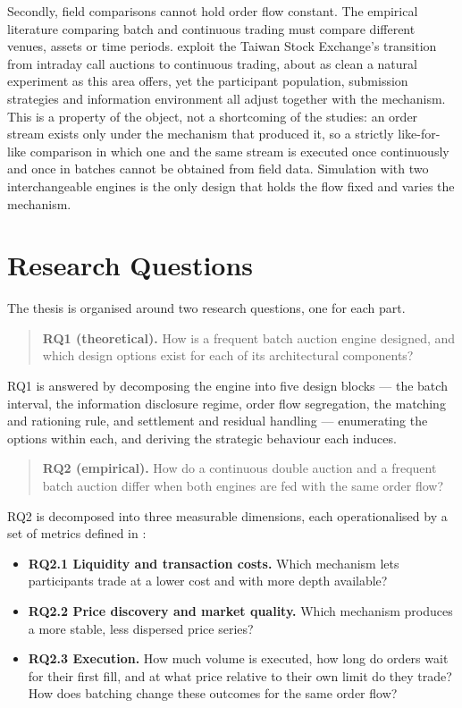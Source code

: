 Secondly, field comparisons cannot hold order flow constant. The
empirical literature comparing batch and continuous trading must compare different venues, assets or time periods. \citet{lee2026taiwan}
exploit the Taiwan Stock Exchange's transition from intraday call auctions
to continuous trading, about as clean a natural experiment as this area
offers, yet the participant population, submission strategies and
information environment all adjust together with the mechanism. This is a
property of the object, not a shortcoming of the studies: an order stream
exists only under the mechanism that produced it, so a strictly
like-for-like comparison in which one and the same stream is executed once
continuously and once in batches cannot be obtained from field data.
Simulation with two interchangeable engines is the only design that holds
the flow fixed and varies the mechanism.

\section{Research Questions}
\label{sec:rqs}

The thesis is organised around two research questions, one for each part.

\begin{quote}
\textbf{RQ1 (theoretical).} How is a frequent batch auction engine
designed, and which design options exist for each of its architectural
components?
\end{quote}

RQ1 is answered by decomposing the engine into five design blocks --- the
batch interval, the information disclosure regime, order flow segregation,
the matching and rationing rule, and settlement and residual handling ---
enumerating the options within each, and deriving the strategic behaviour
each induces.

\begin{quote}
\textbf{RQ2 (empirical).} How do a continuous double auction and a
frequent batch auction differ when both engines are fed with the same
order flow?
\end{quote}

RQ2 is decomposed into three measurable dimensions, each operationalised by
a set of metrics defined in :

\begin{itemize}
  \item \textbf{RQ2.1 Liquidity and transaction costs.} Which mechanism
  lets participants trade at a lower cost and with more depth available?
  \item \textbf{RQ2.2 Price discovery and market quality.} Which mechanism
  produces a more stable, less dispersed price series?
  \item \textbf{RQ2.3 Execution.} How much volume is executed, how long do
  orders wait for their first fill, and at what price relative to their own
  limit do they trade? How does batching change these outcomes for the same
  order flow?
\end{itemize}





